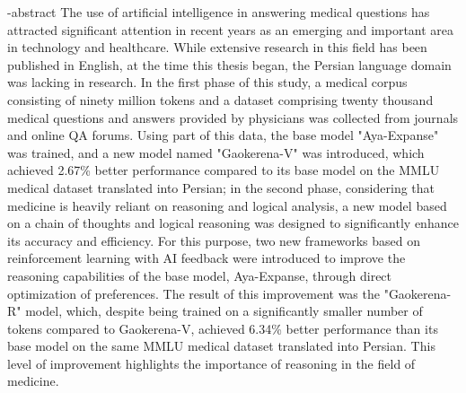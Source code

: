 
\en-abstract{
The use of artificial intelligence in answering medical questions has attracted significant attention in recent years as an emerging and important area in technology and healthcare. While extensive research in this field has been published in English, at the time this thesis began, the Persian language domain was lacking in research. In the first phase of this study, a medical corpus consisting of ninety million tokens and a dataset comprising twenty thousand medical questions and answers provided by physicians was collected from journals and online QA forums. Using part of this data, the base model "Aya-Expanse" was trained, and a new model named "Gaokerena-V" was introduced, which achieved 2.67\% better performance compared to its base model on the MMLU medical dataset translated into Persian; in the second phase, considering that medicine is heavily reliant on reasoning and logical analysis, a new model based on a chain of thoughts and logical reasoning was designed to significantly enhance its accuracy and efficiency. For this purpose, two new frameworks based on reinforcement learning with AI feedback were introduced to improve the reasoning capabilities of the base model, Aya-Expanse, through direct optimization of preferences. The result of this improvement was the "Gaokerena-R" model, which, despite being trained on a significantly smaller number of tokens compared to Gaokerena-V, achieved 6.34\% better performance than its base model on the same MMLU medical dataset translated into Persian. This level of improvement highlights the importance of reasoning in the field of medicine.
}
